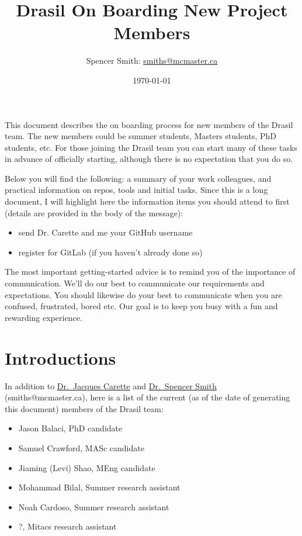 \documentclass[12pt]{article}
\begin{document}
\title{Drasil On Boarding New Project Members}

\author{Spencer Smith: \href{mailto:smiths@mcmaster.ca}{smiths@mcmaster.ca}}
\date{\today}

\maketitle

\tableofcontents

\newpage

This document describes the on boarding process for new members of the Drasil
team.  The new members could be summer students, Masters students, PhD students,
etc. For those joining the Drasil team you can start many of these tasks in advance
of officially starting, although there is no expectation that you do so.

Below you will find the following: a summary of your work colleagues, and
practical information on repos, tools and initial tasks. Since this is a long
document, I will highlight here the information items you should attend to first
(details are provided in the body of the message):

\begin{itemize}
\item send Dr. Carette and me your GitHub username
\item register for GitLab (if you haven't already done so)
\end{itemize}

The most important getting-started advice is to remind you of the importance of
communication.  We'll do our best to communicate our requirements and
expectations.  You should likewise do your best to communicate when you are
confused, frustrated, bored etc.  Our goal is to keep you busy with a fun and
rewarding experience.

\section{Introductions} \label{SecIntroductions}

In addition to \href{https://www.cas.mcmaster.ca/~carette/} {Dr.\ Jacques
Carette} and \href{https://www.cas.mcmaster.ca/~smiths/} {Dr.\ Spencer Smith}
(smiths@mcmaster.ca), here is a list of the current (as of the date of
generating this document) members of the Drasil team:

\begin{itemize}
\item Jason Balaci, PhD candidate
\item Samuel Crawford, MASc candidate
\item Jiaming (Levi) Shao, MEng candidate
\item Mohammad Bilal, Summer research assistant
\item Noah Cardoso, Summer research assistant
\item ?, Mitacs research assistant
\end{itemize}
\end{document}
